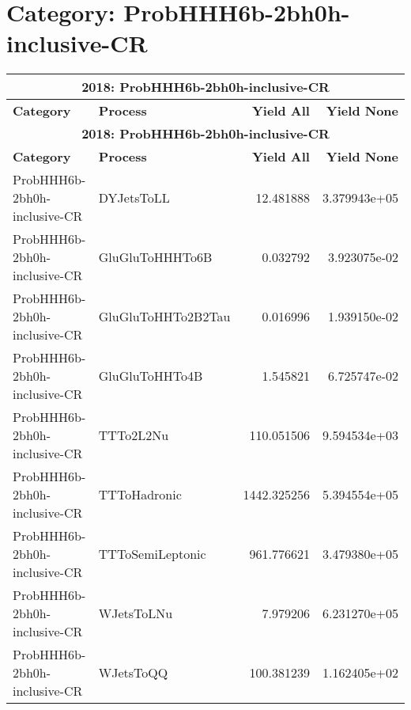 \documentclass{article}
\begin{document}
\section*{Category: ProbHHH6b-2bh0h-inclusive-CR}
\begin{longtable}[c]{|l|l|r|r|}
\hline
\multicolumn{4}{|c|}{\textbf{2018: ProbHHH6b-2bh0h-inclusive-CR}} \\
\hline
\textbf{Category} & \textbf{Process} & \textbf{Yield All} & \textbf{Yield None} \\
\hline
\endfirsthead
\hline
\multicolumn{4}{|c|}{\textbf{2018: ProbHHH6b-2bh0h-inclusive-CR}} \\
\hline
\textbf{Category} & \textbf{Process} & \textbf{Yield All} & \textbf{Yield None} \\
\hline
\endhead
ProbHHH6b-2bh0h-inclusive-CR & DYJetsToLL & 12.481888 & 3.379943e+05 \\
\hline
ProbHHH6b-2bh0h-inclusive-CR & GluGluToHHHTo6B & 0.032792 & 3.923075e-02 \\
\hline
ProbHHH6b-2bh0h-inclusive-CR & GluGluToHHTo2B2Tau & 0.016996 & 1.939150e-02 \\
\hline
ProbHHH6b-2bh0h-inclusive-CR & GluGluToHHTo4B & 1.545821 & 6.725747e-02 \\
\hline
ProbHHH6b-2bh0h-inclusive-CR & TTTo2L2Nu & 110.051506 & 9.594534e+03 \\
\hline
ProbHHH6b-2bh0h-inclusive-CR & TTToHadronic & 1442.325256 & 5.394554e+05 \\
\hline
ProbHHH6b-2bh0h-inclusive-CR & TTToSemiLeptonic & 961.776621 & 3.479380e+05 \\
\hline
ProbHHH6b-2bh0h-inclusive-CR & WJetsToLNu & 7.979206 & 6.231270e+05 \\
\hline
ProbHHH6b-2bh0h-inclusive-CR & WJetsToQQ & 100.381239 & 1.162405e+02 \\
\hline
\end{longtable}
\end{document}
